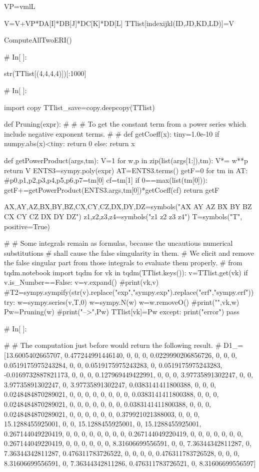                                         VP=vmlL
      
                                        V=V+VP*DA[I]*DB[J]*DC[K]*DD[L]
                        TTlist[indexijkl(ID,JD,KD,LD)]=V
                        
ComputeAllTwoERI()


# In[ ]:


str(TTlist[(4,4,4,4)])[:1000]


# In[ ]:


import copy
TTlist_save=copy.deepcopy(TTlist)

def Pruning(expr):
#
#
#   To get the constant term from a power series which include negative exponent terms.
#
#
    def getCoeff(x):
        tiny=1.0e-10
        if numpy.abs(x)<tiny:
            return 0
        else:
            return x

    def getPowerProduct(args,tm):
        V=1
        for w,p in zip(list(args[1:]),tm):
            V*= w**p
        return V
    ENTS3=sympy.poly(expr)
    AT=ENTS3.terms()
    getF=0
    for tm in AT:
        #p0,p1,p2,p3,p4,p5,p6,p7=tm[0]
        cf=tm[1]
        if 0==max(list(tm[0])):
            getF+=getPowerProduct(ENTS3.args,tm[0])*getCoeff(cf)
    return getF

AX,AY,AZ,BX,BY,BZ,CX,CY,CZ,DX,DY,DZ=symbols("AX AY AZ BX BY BZ CX CY CZ DX DY DZ")
z1,z2,z3,z4=symbols("z1 z2 z3 z4")
T=symbols("T", positive=True)

#
#   Some integrals remain as formulas, because the uncautious numerical substitutions 
#   shall cause the false simgularity in them.
#   We elicit and remove the false singular part from those integrals to evaluate them properly.
#
from tqdm.notebook import tqdm
for vk in tqdm(TTlist.keys()):
    v=TTlist.get(vk)
    if v.is_Number==False:
        v=v.expand()
        #print(vk,v)
        #T2=sympy.sympify(str(v).replace("exp","sympy.exp").replace("erf","sympy.erf"))
        try:
            w=sympy.series(v,T,0)
            w=sympy.N(w)
            w=w.removeO()
            #print("\n",vk,w)
            Pw=Pruning(w)
            #print("-->",Pw)
            TTlist[vk]=Pw
        except:
            print("error")
            pass


# In[ ]:


#
# The computation just before would return the following result.
#
D1_=[13.6005402665707, 0.477244991446140, 0, 0, 0, 0.0229990206856726, 0, 0, 0, 0.0519175975243284, 0, 0, 0.0519175975243283, 0, 0.0519175975243283, -0.0169732887821173, 0, 0, 0, 0.127969449422991, 0, 0, 0, 3.97735891302247, 0, 0, 3.97735891302247, 0, 3.97735891302247, 0.0383141411800388, 0, 0, 0, 0.0248484870289021, 0, 0, 0, 0, 0, 0, 0, 0, 0.0383141411800388, 0, 0, 0, 0.0248484870289021, 0, 0, 0, 0, 0, 0, 0, 0.0383141411800388, 0, 0, 0, 0.0248484870289021, 0, 0, 0, 0, 0, 0, 0.379921021388003, 0, 0, 0, 15.1288455925001, 0, 0, 15.1288455925001, 0, 15.1288455925001, 0.267144049220419, 0, 0, 0, 0, 0, 0, 0, 0, 0.267144049220419, 0, 0, 0, 0, 0, 0, 0, 0.267144049220419, 0, 0, 0, 0, 0, 0, 8.31606699556591, 0, 0, 7.36344342811287, 0, 7.36344342811287, 0.476311783726522, 0, 0, 0, 0, 0.476311783726528, 0, 0, 0, 8.31606699556591, 0, 7.36344342811286, 0.476311783726521, 0, 8.31606699556597]


